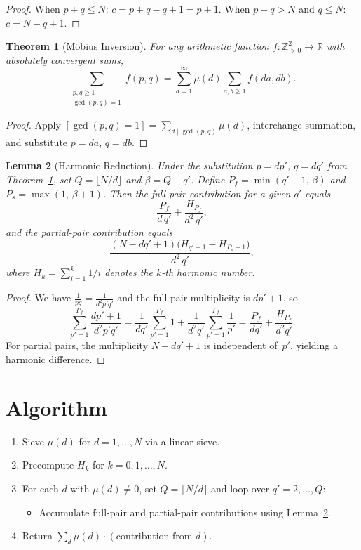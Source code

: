 \documentclass[12pt]{article}
\newtheorem{theorem}{Theorem}
\newtheorem{lemma}[theorem]{Lemma}
\begin{document}
\begin{proof}
When $p + q \leq N$: $c = p + q - q + 1 = p + 1$. When $p + q > N$ and $q \leq N$: $c = N - q + 1$.
\end{proof}

\begin{theorem}[M\"obius Inversion]
\label{thm:mobius}
For any arithmetic function $f \colon \mathbb{Z}_{>0}^2 \to \mathbb{R}$ with absolutely convergent sums,
\[
\sum_{\substack{p,q \geq 1 \\ \gcd(p,q) = 1}} f(p,q) = \sum_{d=1}^{\infty} \mu(d) \sum_{a,b \geq 1} f(da, db).
\]
\end{theorem}

\begin{proof}
Apply $[\gcd(p,q) = 1] = \sum_{d \mid \gcd(p,q)} \mu(d)$, interchange summation, and substitute $p = da$, $q = db$.
\end{proof}

\begin{lemma}[Harmonic Reduction]
\label{lem:harmonic}
Under the substitution $p = dp'$, $q = dq'$ from Theorem~\ref{thm:mobius}, set $Q = \lfloor N/d \rfloor$ and $\beta = Q - q'$. Define $P_f = \min(q'-1,\, \beta)$ and $P_s = \max(1,\, \beta + 1)$. Then the full-pair contribution for a given $q'$ equals
\[
\frac{P_f}{d\,q'} + \frac{H_{P_f}}{d^2\,q'},
\]
and the partial-pair contribution equals
\[
\frac{(N - dq' + 1)\bigl(H_{q'-1} - H_{P_s - 1}\bigr)}{d^2\,q'},
\]
where $H_k = \sum_{i=1}^{k} 1/i$ denotes the $k$-th harmonic number.
\end{lemma}

\begin{proof}
We have $\frac{1}{pq} = \frac{1}{d^2 p' q'}$ and the full-pair multiplicity is $dp' + 1$, so
\[
\sum_{p'=1}^{P_f} \frac{dp' + 1}{d^2 p' q'} = \frac{1}{dq'}\sum_{p'=1}^{P_f} 1 + \frac{1}{d^2 q'}\sum_{p'=1}^{P_f}\frac{1}{p'} = \frac{P_f}{dq'} + \frac{H_{P_f}}{d^2 q'}.
\]
For partial pairs, the multiplicity $N - dq' + 1$ is independent of~$p'$, yielding a harmonic difference.
\end{proof}

\section{Algorithm}

\begin{enumerate}
\item Sieve $\mu(d)$ for $d = 1, \ldots, N$ via a linear sieve.
\item Precompute $H_k$ for $k = 0, 1, \ldots, N$.
\item For each $d$ with $\mu(d) \neq 0$, set $Q = \lfloor N/d \rfloor$ and loop over $q' = 2, \ldots, Q$:
  \begin{itemize}
  \item Accumulate full-pair and partial-pair contributions using Lemma~\ref{lem:harmonic}.
  \end{itemize}
\item Return $\sum_d \mu(d) \cdot (\text{contribution from } d)$.
\end{enumerate}
\end{document}
